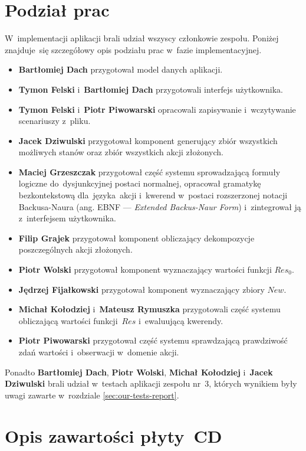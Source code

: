 \documentclass[11pt,a4paper]{article}
\begin{document}
\section{Podział prac}

W~implementacji aplikacji brali udział wszyscy członkowie zespołu.
Poniżej znajduje~się szczegółowy opis podziału prac w~fazie implementacyjnej.

\begin{itemize}
    \item \textbf{Bartłomiej Dach} przygotował model danych aplikacji.
    \item \textbf{Tymon Felski} i~\textbf{Bartłomiej Dach} przygotowali interfejs użytkownika.
    \item \textbf{Tymon Felski} i~\textbf{Piotr Piwowarski} opracowali zapisywanie i~wczytywanie scenariuszy z~pliku.
    \item \textbf{Jacek Dziwulski} przygotował komponent generujący zbiór wszystkich możliwych stanów oraz zbiór wszystkich akcji złożonych.
    \item \textbf{Maciej Grzeszczak} przygotował część systemu sprowadzającą formuły logiczne do~dysjunkcyjnej postaci normalnej, opracował gramatykę bezkontekstową dla~języka~akcji i~kwerend w~postaci rozszerzonej notacji Backusa-Naura (ang. EBNF --- \emph{Extended Backus-Naur Form}) i~zintegrował ją z~interfejsem użytkownika.
    \item \textbf{Filip Grajek} przygotował komponent obliczający dekompozycje poszczególnych akcji złożonych.
    \item \textbf{Piotr Wolski} przygotował komponent wyznaczający wartości funkcji ${Res}_0$.
    \item \textbf{Jędrzej Fijałkowski} przygotował komponent wyznaczający zbiory $New$.
    \item \textbf{Michał Kołodziej} i~\textbf{Mateusz Rymuszka} przygotowali część systemu obliczającą wartości funkcji~$Res$ i~ewaluującą kwerendy.
    \item \textbf{Piotr Piwowarski} przygotował część systemu sprawdzającą prawdziwość zdań wartości i~obserwacji w~domenie akcji.
\end{itemize}

Ponadto \textbf{Bartłomiej Dach}, \textbf{Piotr Wolski}, \textbf{Michał Kołodziej} i~\textbf{Jacek Dziwulski} brali udział w~testach aplikacji zespołu nr~3, których wynikiem były uwagi zawarte w~rozdziale \ref{sec:our-tests-report}.

\section{Opis zawartości płyty~CD}
\end{document}
